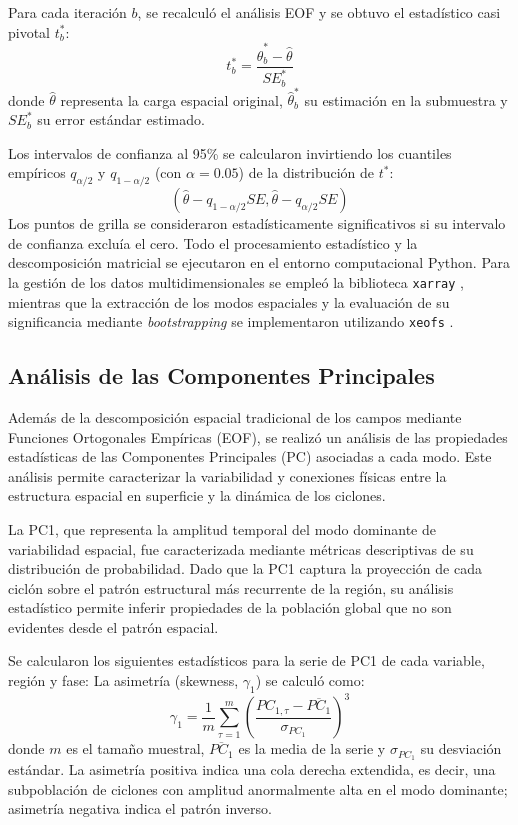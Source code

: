 Para cada iteración $b$, se recalculó el análisis EOF y se obtuvo el estadístico casi pivotal $t^*_b$:
\begin{equation}
    t^*_b = \frac{\hat{\theta}^*_b - \hat{\theta}}{SE^*_b}
\end{equation}
donde $\hat{\theta}$ representa la carga espacial original, $\hat{\theta}^*_b$ su estimación en la submuestra y $SE^*_b$ su error estándar estimado.

Los intervalos de confianza al 95\% se calcularon invirtiendo los cuantiles empíricos $q_{\alpha/2}$ y $q_{1-\alpha/2}$ (con $\alpha = 0.05$) de la distribución de $t^*$:
\begin{equation}
    (\hat{\theta} - q_{1-\alpha/2}SE, \hat{\theta} - q_{\alpha/2}SE)
\end{equation}
Los puntos de grilla se consideraron estadísticamente significativos si su intervalo de confianza excluía el cero. Todo el procesamiento estadístico y la descomposición matricial se ejecutaron en el entorno computacional Python. Para la gestión de los datos multidimensionales se empleó la biblioteca \texttt{xarray} \citep{hoyer2017xarray}, mientras que la extracción de los modos espaciales y la evaluación de su significancia mediante \textit{bootstrapping} se implementaron utilizando \texttt{xeofs} \citep{rieger2024xeofs}.


\subsection{Análisis de las Componentes Principales}\label{subsec:analisis_pc}

Además de la descomposición espacial tradicional de los campos mediante Funciones Ortogonales Empíricas (EOF), se realizó un análisis de las propiedades estadísticas de las Componentes Principales (PC) asociadas a cada modo. Este análisis permite caracterizar la variabilidad y conexiones físicas entre la estructura espacial en superficie y la dinámica de los ciclones.

La PC1, que representa la amplitud temporal del modo dominante de variabilidad espacial, fue caracterizada mediante métricas descriptivas de su distribución de probabilidad. Dado que la PC1 captura la proyección de cada ciclón sobre el patrón estructural más recurrente de la región, su análisis estadístico permite inferir propiedades de la población global que no son evidentes desde el patrón espacial.

Se calcularon los siguientes estadísticos para la serie de PC1 de cada variable, región y fase:
La asimetría (skewness, $\gamma_1$) se calculó como:
\begin{equation}
    \gamma_1 = \frac{1}{m} \sum_{\tau=1}^{m} \left(\frac{PC_{1,\tau} - \overline{PC_1}}{\sigma_{PC_1}}\right)^3
\end{equation}
donde $m$ es el tamaño muestral, $\overline{PC_1}$ es la media de la serie y $\sigma_{PC_1}$ su desviación estándar. La asimetría positiva indica una cola derecha extendida, es decir, una subpoblación de ciclones con amplitud anormalmente alta en el modo dominante; asimetría negativa indica el patrón inverso.

